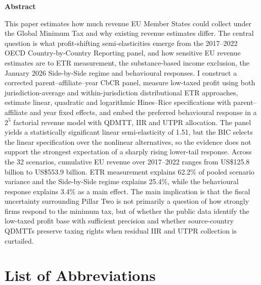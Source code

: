\documentclass[11pt,a4paper]{article}
\begin{document}
\newpage
\thispagestyle{plain}
\setcounter{page}{1}

{}
\begin{center}
  {\large\bfseries Abstract}
\end{center}

\noindent

This paper estimates how much revenue EU Member States could collect under the Global Minimum Tax and why existing revenue estimates differ. The central question is what profit-shifting semi-elasticities emerge from the 2017--2022 OECD Country-by-Country Reporting panel, and how sensitive EU revenue estimates are to ETR measurement, the substance-based income exclusion, the January 2026 Side-by-Side regime and behavioural responses. I construct a corrected parent--affiliate--year CbCR panel, measure low-taxed profit using both jurisdiction-average and within-jurisdiction distributional ETR approaches, estimate linear, quadratic and logarithmic Hines--Rice specifications with parent--affiliate and year fixed effects, and embed the preferred behavioural response in a $2^5$ factorial revenue model with QDMTT, IIR and UTPR allocation. The panel yields a statistically significant linear semi-elasticity of 1.51, but the BIC selects the linear specification over the nonlinear alternatives, so the evidence does not support the strongest expectation of a sharply rising lower-tail response. Across the 32 scenarios, cumulative EU revenue over 2017--2022 ranges from US\$125.8 billion to US\$553.9 billion. ETR measurement explains 62.2\% of pooled scenario variance and the Side-by-Side regime explains 25.4\%, while the behavioural response explains 3.4\% as a main effect. The main implication is that the fiscal uncertainty surrounding Pillar Two is not primarily a question of how strongly firms respond to the minimum tax, but of whether the public data identify the low-taxed profit base with sufficient precision and whether source-country QDMTTs preserve taxing rights when residual IIR and UTPR collection is curtailed.

\newpage

\tableofcontents

\newpage
\listoftables
\listoffigures

\newpage
{}
{}
\section*{List of Abbreviations}
\end{document}
